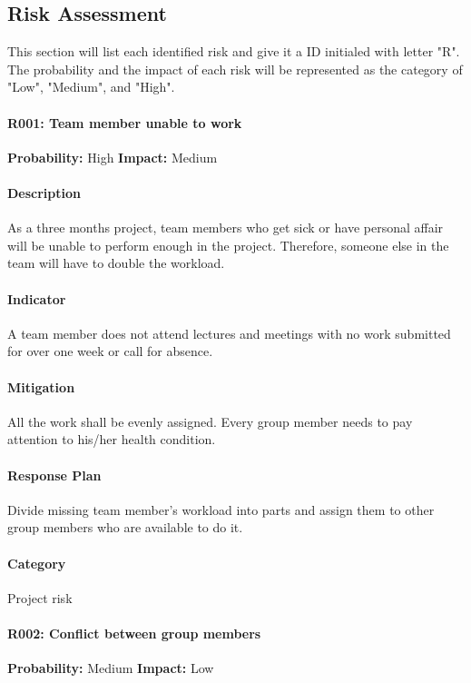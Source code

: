 \documentclass[11pt, a4paper]{report}
\begin{document}
\subsection{Risk Assessment}
This section will list each identified risk and give it a ID initialed with letter "R". The probability and the impact of each risk will be represented as the category of "Low", "Medium", and "High". \\
	\paragraph{R001: Team member unable to work} \hspace{1cm} \textbf{Probability: }High\hspace{1cm}   \textbf{Impact: }Medium
	\paragraph{Description}As a three months project, team members who get sick or have personal affair will be unable to perform enough in the project. Therefore, someone else in the team will have to double the workload.
	\paragraph{Indicator}A team member does not attend lectures and meetings with no work submitted for over one week or call for absence.
	\paragraph{Mitigation}All the work shall be evenly assigned. Every group member needs to pay attention to his/her health condition.
	\paragraph{Response Plan}Divide missing team member's workload into parts and assign them to other group members who are available to do it. \\
	\paragraph{Category} Project risk

	\paragraph{R002: Conflict between group members} \hspace{1cm} \textbf{Probability: }Medium\hspace{1cm}   \textbf{Impact: }Low
\end{document}
